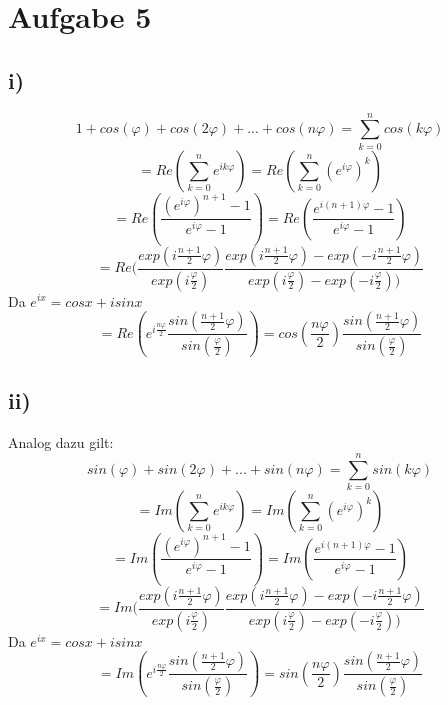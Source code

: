 \section{Aufgabe 5}
    \subsection{i)}
        $$1+cos(\varphi)+cos(2\varphi)+...+cos(n\varphi)=\sum_{k=0}^ncos(k\varphi)$$
        $$=Re(\sum_{k=0}^ne^{ik\varphi})=Re(\sum_{k=0}^n(e^{i\varphi})^k)$$
        $$=Re(\frac{(e^{i\varphi})^{n+1}-1}{e^{i\varphi}-1})=Re(\frac{e^{i(n+1)\varphi}-1}{e^{i\varphi}-1})$$
        $$=Re(\frac{exp(i\frac{n+1}{2}\varphi)}{exp(i\frac{\varphi}{2})}\frac{exp(i\frac{n+1}{2}\varphi)-exp(-i\frac{n+1}{2}\varphi)}{exp(i\frac{\varphi}{2})-exp(-i\frac{\varphi}{2}))}$$
        Da $e^{ix}=cosx+isinx$
        $$=Re(e^{i\frac{n\varphi}{2}}\frac{sin(\frac{n+1}{2}\varphi)}{sin(\frac{\varphi}{2})})=cos(\frac{n\varphi}{2})\frac{sin(\frac{n+1}{2}\varphi)}{sin(\frac{\varphi}{2})}$$

    \subsection{ii)}
        Analog dazu gilt:
        $$sin(\varphi)+sin(2\varphi)+...+sin(n\varphi)=\sum_{k=0}^nsin(k\varphi)$$
        $$=Im(\sum_{k=0}^ne^{ik\varphi})=Im(\sum_{k=0}^n(e^{i\varphi})^k)$$
        $$=Im(\frac{(e^{i\varphi})^{n+1}-1}{e^{i\varphi}-1})=Im(\frac{e^{i(n+1)\varphi}-1}{e^{i\varphi}-1})$$
        $$=Im(\frac{exp(i\frac{n+1}{2}\varphi)}{exp(i\frac{\varphi}{2})}\frac{exp(i\frac{n+1}{2}\varphi)-exp(-i\frac{n+1}{2}\varphi)}{exp(i\frac{\varphi}{2})-exp(-i\frac{\varphi}{2}))}$$
        Da $e^{ix}=cosx+isinx$
        $$=Im(e^{i\frac{n\varphi}{2}}\frac{sin(\frac{n+1}{2}\varphi)}{sin(\frac{\varphi}{2})})=sin(\frac{n\varphi}{2})\frac{sin(\frac{n+1}{2}\varphi)}{sin(\frac{\varphi}{2})}$$